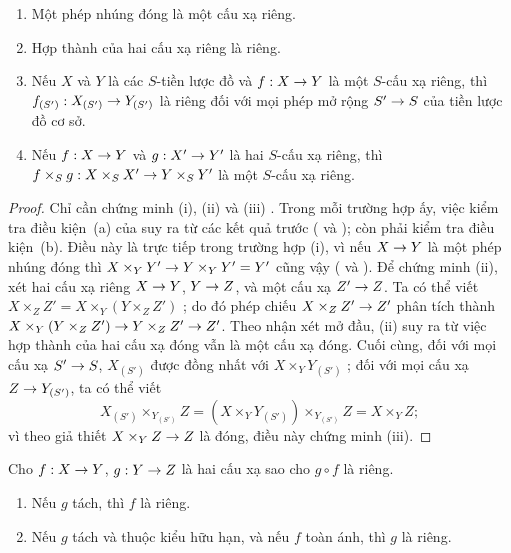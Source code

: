 \documentclass[oneside,10pt]{amsart}
\makeatletter
\newcommand{\ega@arrow}[2]{\mathchoice{#1}{#2}{#2}{#2}}
\renewcommand{\to}{\ega@arrow{\longrightarrow}{\rightarrow}}
\newcommand{\oldpage}[2][]{\marginnote{\normalfont\footnotesize\textbf{#1}~|~#2}\ignorespaces}
\let\EGAOriginalLabel\label
\renewcommand{\label}[1]{\phantomsection\EGAOriginalLabel{#1}}
\makeatother
\begin{document}
\begin{proposition}[5.4.2]
\label{II.5.4.2}
\medskip\noindent
\begin{enumerate}
  \item[{\rm(i)}] Một phép nhúng đóng là một cấu xạ riêng.
  \item[{\rm(ii)}] Hợp thành của hai cấu xạ riêng là riêng.
  \item[{\rm(iii)}] Nếu $X$ và $Y$ là các $S$-tiền lược đồ và $f:X\to Y$ là một $S$-cấu xạ riêng, thì $f_{(S')}:X_{(S')}\to Y_{(S')}$ là riêng đối với mọi phép mở rộng $S'\to S$ của tiền lược đồ cơ sở.
  \item[{\rm(iv)}] Nếu $f:X\to Y$ và $g:X'\to Y'$ là hai $S$-cấu xạ riêng, thì $f\times_S g:X\times_S X'\to Y\times_S Y'$ là một $S$-cấu xạ riêng.
\end{enumerate}
\end{proposition}
\oldpage[II]{101}
\begin{proof}
Chỉ cần chứng minh (i), (ii) và (iii) .
Trong mỗi trường hợp ấy, việc kiểm tra điều kiện~(a) của  suy ra từ các kết quả trước ( và ); còn phải kiểm tra điều kiện~(b).
Điều này là trực tiếp trong trường hợp (i), vì nếu $X\to Y$ là một phép nhúng đóng thì $X\times_Y Y'\to Y\times_Y Y'=Y'$ cũng vậy ( và ).
Để chứng minh (ii), xét hai cấu xạ riêng $X\to Y$, $Y\to Z$, và một cấu xạ $Z'\to Z$.
Ta có thể viết $X\times_Z Z'=X\times_Y(Y\times_Z Z')$ ; do đó phép chiếu $X\times_Z Z'\to Z'$ phân tích thành $X\times_Y(Y\times_Z Z')\to Y\times_Z Z'\to Z'$.
Theo nhận xét mở đầu, (ii) suy ra từ việc hợp thành của hai cấu xạ đóng vẫn là một cấu xạ đóng.
Cuối cùng, đối với mọi cấu xạ $S'\to S$, $X_{(S')}$ được đồng nhất với $X\times_Y Y_{(S')}$ ; đối với mọi cấu xạ $Z\to Y_{(S')}$, ta có thể viết
\[
  X_{(S')}\times_{Y_{(S')}}Z=(X\times_Y Y_{(S')})\times_{Y_{(S')}}Z=X\times_Y Z;
\]
vì theo giả thiết $X\times_Y Z\to Z$ là đóng, điều này chứng minh (iii).
\end{proof}

\begin{corollary}[5.4.3]
\label{II.5.4.3}
Cho $f:X\to Y$, $g:Y\to Z$ là hai cấu xạ sao cho $g\circ f$ là riêng.
\begin{enumerate}
  \item[{\rm(i)}] Nếu $g$ tách, thì $f$ là riêng.
  \item[{\rm(ii)}] Nếu $g$ tách và thuộc kiểu hữu hạn, và nếu $f$ toàn ánh, thì $g$ là riêng.
\end{enumerate}
\end{corollary}
\end{document}
